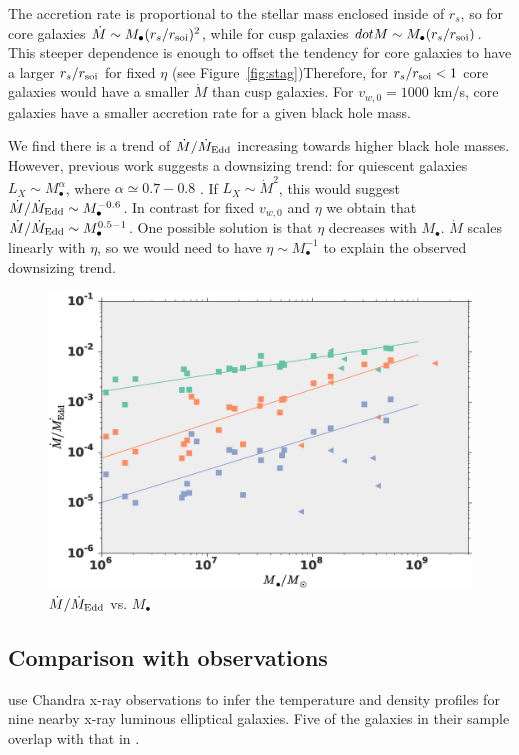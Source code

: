 \documentclass[usenatbib,fleqn]{mn2e}
\newcommand{\eddr}{\dot{M}/\dot{M}_{\rm Edd}}
\newcommand{\rs}{r_s}
\newcommand{\Mbh}[1][]{M_{\bullet#1}}
\newcommand{\soi}{\rm soi}
\newcommand{\rsoi}{r_{\soi}}
\newcommand{\vwO}{v_{w,0}}
\begin{document}
The accretion rate is proportional to the stellar mass enclosed inside of $\rs$, so for core galaxies $\dot{M}\sim \Mbh (\rs/\rsoi)^{2}$, while for cusp galaxies $dot{M}\sim \Mbh (\rs/\rsoi)$.  This steeper dependence is enough to offset the tendency for core galaxies to have a larger $\rs/\rsoi$ for fixed $\eta$ (see Figure~\ref{fig:stag})Therefore, for $\rs/\rsoi<1$ core galaxies would have a smaller $\dot{M}$ than cusp galaxies.  For $\vwO=1000$ km/s, core galaxies have a smaller accretion rate for a given black hole mass.  

We find there is a trend of $\eddr$ increasing towards higher black hole masses. However, previous work  suggests a downsizing trend: for quiescent galaxies $L_X \sim \Mbh^\alpha$, where $\alpha\simeq 0.7-0.8$ \citep{MillerGallo+:2014a}. If $L_X\sim\dot{M}^2$, this would suggest $\eddr\sim \Mbh^{-0.6}$. In contrast for fixed $\vwO$ and $\eta$ we obtain that $\eddr\sim \Mbh^{0.5-1}$. One possible solution is that $\eta$ decreases with $\Mbh$. $\dot{M}$ scales linearly with $\eta$, so we would need to have $\eta\sim \Mbh^{-1}$ to explain the observed downsizing trend.  

\begin{figure}
\includegraphics[width=\columnwidth]{mdot_mass.eps}
\caption{\label{fig:mdot_mass}$\eddr$ vs. $\Mbh$}
\end{figure}


\subsection{Comparison with observations}
\citealt{AllenDunn+:2006a} use Chandra x-ray observations to infer the temperature and density profiles for nine nearby x-ray luminous elliptical galaxies.  Five of the galaxies in their sample overlap with that in . 
\end{document}
